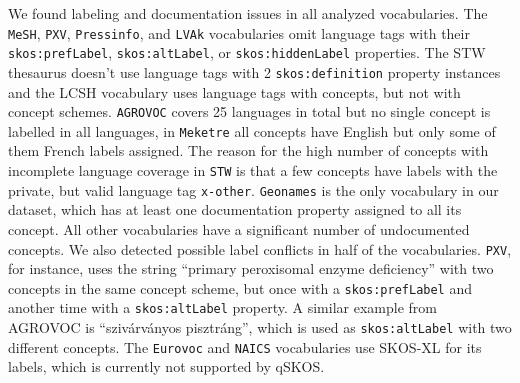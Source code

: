 We found labeling and documentation issues in all analyzed vocabularies. 
The \texttt{MeSH}, \texttt{PXV}, \texttt{Pressinfo}, and \texttt{LVAk} vocabularies omit language tags with their \texttt{skos:prefLabel}, \texttt{skos:altLabel}, or \texttt{skos:hiddenLabel} properties. The STW thesaurus doesn't use language tags with 2 \texttt{skos:definition} property instances and the LCSH vocabulary uses language tags with concepts, but not with concept schemes.
\texttt{AGROVOC} covers 25 languages in total but no single concept is labelled in all languages, in \texttt{Meketre} all concepts have English but only some of them French labels assigned. The reason for the high number of concepts with incomplete language coverage in \texttt{STW} is that a few concepts have labels with the private, but valid language tag \texttt{x-other}. 
\texttt{Geonames} is the only vocabulary in our dataset, which has at least one documentation property assigned to all its concept. All other vocabularies have a significant number of undocumented concepts.
We also detected possible label conflicts in half of the vocabularies. \texttt{PXV}, for instance, uses the string ``primary peroxisomal enzyme deficiency'' with two concepts in the same concept scheme, but once with a \texttt{skos:prefLabel} and another time with a \texttt{skos:altLabel} property. A similar example from AGROVOC is ``sziv\'{a}rv\'{a}nyos pisztr\'{a}ng'', which is used as \texttt{skos:altLabel} with two different concepts.
The \texttt{Eurovoc} and \texttt{NAICS} vocabularies use SKOS-XL for its labels, which is currently not supported by qSKOS.


